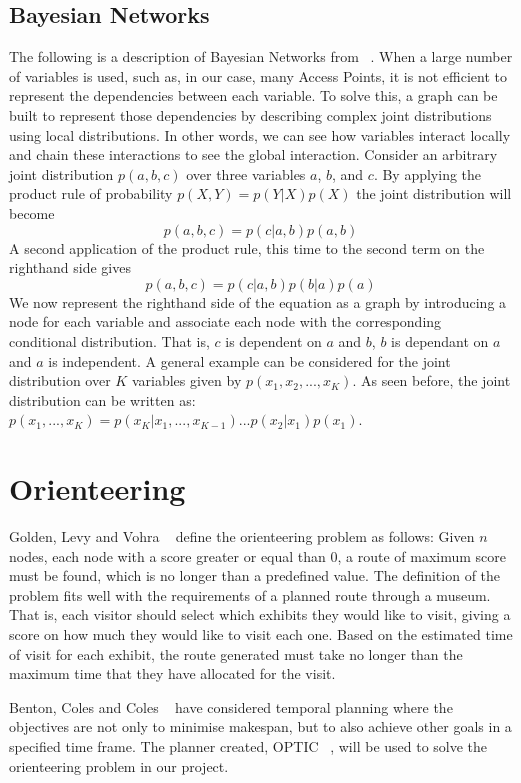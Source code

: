\subsection{Bayesian Networks}
The following is a description of Bayesian Networks from ~\cite{Bishop}. When a large number of variables is used, such as, in our case, many Access Points, it is not efficient to represent the dependencies between each variable. To solve this, a graph can be built to represent those dependencies by describing complex joint distributions using local distributions. In other words, we can see how variables interact locally and chain these interactions to see the global interaction.
Consider an arbitrary joint distribution $p(a,b,c)$ over three variables $a$, $b$, and $c$.
By applying the product rule of probability $p(X,Y) = p(Y|X)p(X)$ the joint distribution will become $$p(a,b,c) = p(c|a,b)p(a,b)$$
A second application of the product rule, this time to the second term on the righthand side gives $$p(a,b,c) = p(c|a, b)p(b|a)p(a)$$
We now represent the righthand side of the equation as a graph by introducing a node for each variable and associate each node with the corresponding conditional distribution. That is, $c$ is dependent on $a$ and $b$, $b$ is dependant on $a$ and $a$ is independent. A general example can be considered for the joint distribution over $K$ variables given by $p(x_1,x_2,...,x_K)$. As seen before, the joint distribution can be written as: $p(x_1,...,x_K) = p(x_K|x_1,...,x_{K-1})...p(x_2|x_1)p(x_1)$.

\section{Orienteering}
Golden, Levy and Vohra ~\cite{Golden} define the orienteering problem as follows: Given $n$ nodes, each node with a score greater or equal than 0, a route of maximum score must be found, which is no longer than a predefined value. The definition of the problem fits well with the requirements of a planned route through a museum. That is, each visitor should select which exhibits they would like to visit, giving a score on how much they would like to visit each one. Based on the estimated time of visit for each exhibit, the route generated must take no longer than the maximum time that they have allocated for the visit.

Benton, Coles and Coles ~\cite{Coles} have considered temporal planning where the objectives are not only to minimise makespan, but to also achieve other goals in a specified time frame. The planner created, OPTIC ~\cite{OPTIC}, will be used to solve the orienteering problem in our project.